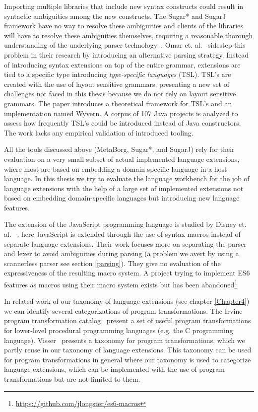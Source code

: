 Importing multiple libraries that include new syntax constructs could result in syntactic ambiguities among the new constructs. The Sugar* and SugarJ framework have no way to resolve these ambiguities and clients of the libraries will have to resolve these ambiguities themselves, requiring a reasonable thorough understanding of the underlying parser technology~\cite{Omar2014}. Omar et. al.~\cite{Omar2014} sidestep this problem in their research by introducing an alternative parsing strategy. Instead of introducing syntax extensions on top of the entire grammar, extensions are tied to a specific type introducing \textit{type-specific languages} (TSL). TSL's are created with the use of layout sensitive grammars, presenting a new set of challenges not faced in this thesis because we do not rely on layout sensitive grammars. The paper introduces a theoretical framework for TSL's and an implementation named Wyvern. A corpus of 107 Java projects is analyzed to assess how frequently TSL's could be introduced instead of Java constructors. The work lacks any empirical validation of introduced tooling.

All the tools discussed above (MetaBorg, Sugar*, and SugarJ) rely for their evaluation on a very small subset of actual implemented language extensions, where most are based on embedding a domain-specific language in a host language. In this thesis we try to evaluate the language workbench for the job of language extensions with the help of a large set of implemented extensions not based on embedding domain-specific languages but introducing new language features.  

The extension of the JavaScript programming language is studied by Disney et. al. ~\cite{Disney2014}, here JavaScript is extended through the use of syntax macros instead of separate language extensions. Their work focuses more on separating the parser and lexer to avoid ambiguities during parsing (a problem we avert by using a scannerless parser see section \ref{parsing}). They give no evaluation of the expressiveness of the resulting macro system. A project trying to implement ES6 features as macros using their macro system exists but has been abandoned\footnote{\url{https://github.com/jlongster/es6-macros}}

In related work of our taxonomy of language extensions (see chapter \ref{Chapter4}) we can identify several categorizations of program transformations. The Irvine program transformation catalog~\cite{Standish1976} present a set of useful program transformations for lower-level procedural programming languages (e.g. the C programming language). Visser~\cite{Visser2001} presents a taxonomy for program transformations, which we partly reuse in our taxonomy of language extensions. This taxonomy can be used for program transformations in general where our taxonomy is used to categorize language extensions, which can be implemented with the use of program transformations but are not limited to them.

